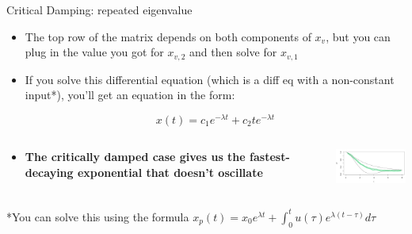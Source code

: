 	\begin{frame}{Critical Damping: repeated eigenvalue}
	    \begin{itemize}
	        \item The top row of the matrix depends on both components of $x_v$, but you can plug in the value you got for $x_{v,2}$ and then solve for $x_{v,1}$
            
            \item If you solve this differential equation (which is a diff eq with a non-constant input*), you’ll get an equation in the form:
            
            $$x(t) = c_1e^{-\lambda{t}} + c_2te^{-\lambda{t}}$$
            
            \item
            \begin{columns}[onlytextwidth,T]
            \column{\dimexpr\linewidth-40mm-5mm}
        	    \textbf{The critically damped case gives us the fastest-decaying exponential that doesn’t oscillate}
        	
        	\column{40mm}
        	    \includegraphics[width=40mm]{./images/eigenvalue-types-4.png}
    	    \end{columns}
	    \end{itemize}
	    
	    *You can solve this using the formula $x_p(t) = x_0e^{\lambda{t}} + \int_0^t u(\tau)e^{\lambda(t-\tau)} d\tau$
	\end{frame}
	

